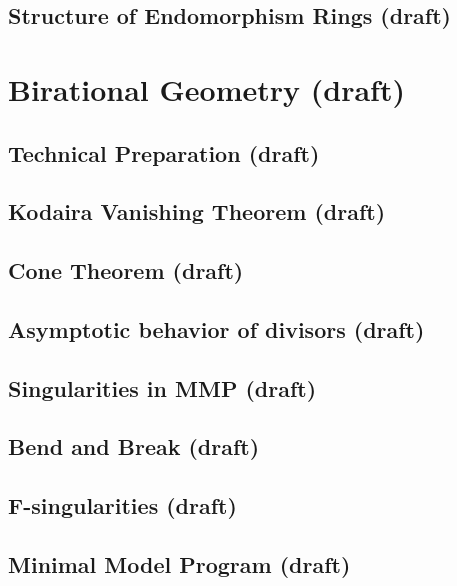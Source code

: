 \documentclass[sectionlevel=book]{noteformyself}
\begin{document}
        \section{Structure of Endomorphism Rings (draft)}
        

    \chapter{Birational Geometry (draft)}
        \section{Technical Preparation (draft)}
        
        \section{Kodaira Vanishing Theorem (draft)}
        
        \section{Cone Theorem (draft)}
        
        \section{Asymptotic behavior of divisors (draft)}
        
        \section{Singularities in MMP (draft)}
        
        \section{Bend and Break (draft)}
        
        \section{F-singularities (draft)}
        
        \section{Minimal Model Program (draft)}
        
\end{document}
